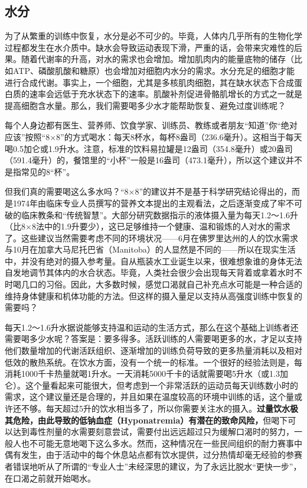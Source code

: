 \subsection{水分}

为了从繁重的训练中恢复，水分是必不可少的。毕竟，人体内几乎所有的生物化学过程都发生在水介质中。缺水会导致运动表现下滑，严重的话，会带来灾难性的后果。随着代谢率的升高，对水的需求也会增加。增加肌肉内的能量底物的储存（比如ATP、磷酸肌酸和糖原）也会增加对细胞内水分的需求。水分充足的细胞才能进行合成代谢。事实上，一个细胞，尤其是多核肌肉细胞，其在缺水状态下合成蛋白质的速率会远低于充水状态下的速率。肌酸补剂促进骨骼肌增长的方式之一就是提高细胞含水量。那么，我们需要喝多少水才能帮助恢复、避免过度训练呢？

每个人身边都有医生、营养师、饮食学家、训练员、教练或者朋友“知道”你“绝对应该”按照“8×8”的方式喝水：每天8杯水，每杯8盎司（236.6毫升）。这相当于每天喝0.5加仑或1.9升水。注意，标准的饮料易拉罐是12盎司（354.8毫升）或20盎司（591.4毫升）的，餐馆里的“小杯”一般是16盎司（473.1毫升），所以这个建议并不是指常见的8“杯”。

但我们真的需要喝这么多水吗？“8×8”的建议并不是基于科学研究结论得出的，而是1974年由临床专业人员撰写的营养文本提出的主观看法，之后逐渐变成了牢不可破的临床教条和“传统智慧”。大部分研究数据指示的液体摄入量为每天1.2～1.6升（比8×8法中的1.9升要少），这已足够维持一个健康、温和锻炼的人对水的需求了。这些建议当然需要考虑不同的环境状况——6月在佛罗里达州的人的饮水需求与10月在加拿大马尼托巴省（Manitoba）的人显然是不同的——所以在现实生活中，并没有绝对的摄入参考量。自从瓶装水工业诞生以来，很难想象谁的身体无法自发地调节其体内的水合状态。毕竟，人类社会很少会出现每天背着或拿着水时不时喝几口的习俗。因此，大多数时候，感觉口渴就自己补充点水可能是一种合适的维持身体健康和机体功能的方法。但这样的摄入量足以支持从高强度训练中恢复的需要吗？

每天1.2～1.6升水据说能够支持温和运动的生活方式，那么在这个基础上训练者还需要喝多少水呢？答案是：要多得多。活跃训练的人需要喝更多的水，才足以支持他们数量增加的代谢活跃组织、逐渐增加的训练负荷导致的更多热量消耗以及相对低效的散热系统。在饮水方面，没有一个统一的标准。一个很好的经验法则是，每消耗1000千卡热量就喝1升水。一天消耗5000千卡的话就需要喝5升水（或1.3加仑）。这个量看起来可能很大，但考虑到一个非常活跃的运动员每天训练数小时的需求，这个建议量还是合理的，并且如果在温度较高的环境中训练的话，这个量或许还不够。每天超过5升的饮水相当多了，所以你需要关注水的摄入。\textbf{过量饮水极其危险，由此导致的低钠血症（Hyponatremia）有潜在的致命风险，}但喝下可以达到毒性剂量的水需要刻意尝试，需要付出远远超过只为缓解口渴时的努力，一般人也不可能无意地喝下这么多水。然而，这种情况在一些民间组织的耐力赛事中偶有发生，由于活动中的每个休息站点都有饮水提供，过分热情却毫无经验的参赛者错误地听从了所谓的“专业人士”未经深思的建议，为了永远比脱水“更快一步”，在口渴之前就开始喝水。

